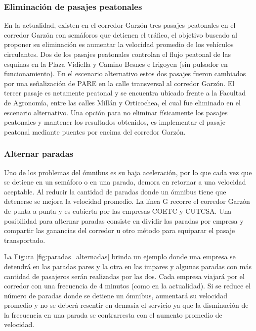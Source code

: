\subsubsection{Eliminación de pasajes peatonales}
En la actualidad, existen en el corredor Garzón tres pasajes peatonales en el corredor Garzón con semáforos que detienen el tráfico, el objetivo buscado al proponer su eliminación es aumentar la velocidad promedio de los vehículos circulantes. Dos de los pasajes peatonales controlan el flujo peatonal de las esquinas en la Plaza Vidiella y Camino Besnes e Irigoyen (sin pulsador en funcionamiento). En el escenario alternativo estos dos pasajes fueron cambiados por una señalización de {PARE} en la calle transversal al corredor Garzón. El tercer pasaje es netamente peatonal y se encuentra ubicado frente a la Facultad de Agronomía, entre las calles Millán y Orticochea, el cual fue eliminado en el escenario alternativo. Una opción para no eliminar físicamente los pasajes peatonales y mantener los resultados obtenidos, es implementar el pasaje peatonal mediante puentes por encima del corredor Garzón.

\subsubsection{Alternar paradas}

Uno de los problemas del ómnibus es su baja aceleración, por lo que cada vez que se detiene en un semáforo o en una parada, demora en retornar a una velocidad aceptable. Al reducir la cantidad de paradas donde un ómnibus tiene que detenerse se mejora la velocidad promedio.
La línea G recorre el corredor Garzón de punta a punta y es cubierta por las empresas COETC y CUTCSA. Una posibilidad para alternar paradas consiste en dividir las paradas por empresa y compartir las ganancias del corredor u otro método para equiparar el pasaje transportado. 

La Figura \ref{fig:paradas_alternadas} brinda un ejemplo donde una empresa se detendrá en las paradas pares y la otra en las impares y algunas paradas con más cantidad de pasajeros serán realizadas por las dos. Cada empresa viajará por el corredor con una frecuencia de 4 minutos (como en la actualidad). Si se reduce el número de paradas donde se detiene un ómnibus, aumentará su velocidad promedio y no se deberá resentir en demasía el servicio ya que la disminución de la frecuencia en una parada se contrarresta con el aumento promedio de velocidad.



